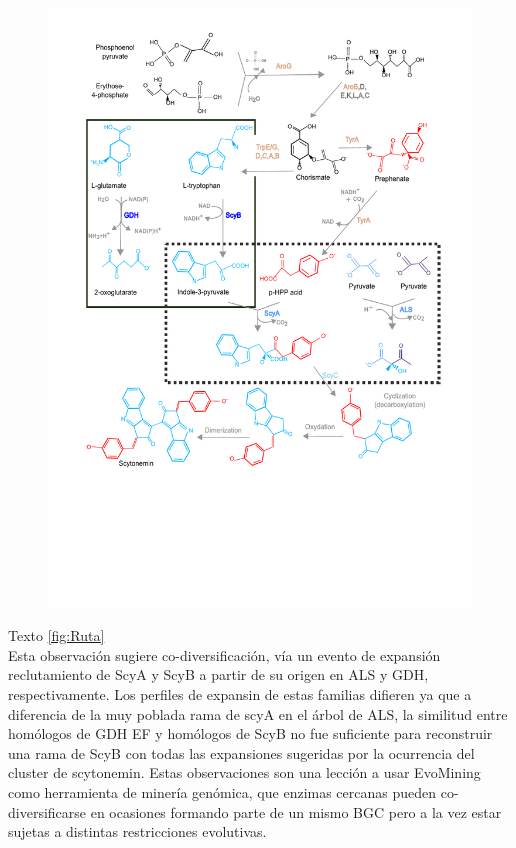 \documentclass[12pt,twoside]{reedthesis}
\begin{document}
  \begin{figure}[h!tbp]
  \centering
  \includegraphics[angle = 0,scale = .5]{chapter2/FigurasPaper/Figure6.pdf}
  \caption[EvoMining Algorithm]{\footnotesize{}}
  \label{fig:Ruta}
  \end{figure}
  
  Texto \autoref{fig:Ruta}\\
  Esta observación sugiere co-diversificación, vía un evento de expansión
  reclutamiento de ScyA y ScyB a partir de su origen en ALS y GDH,
  respectivamente. Los perfiles de expansin de estas familias difieren ya
  que a diferencia de la muy poblada rama de scyA en el árbol de ALS, la
  similitud entre homólogos de GDH EF y homólogos de ScyB no fue
  suficiente para reconstruir una rama de ScyB con todas las expansiones
  sugeridas por la ocurrencia del cluster de scytonemin. Estas
  observaciones son una lección a usar EvoMining como herramienta de
  minería genómica, que enzimas cercanas pueden co-diversificarse en
  ocasiones formando parte de un mismo BGC pero a la vez estar sujetas a
  distintas restricciones evolutivas.
  
\end{document}

